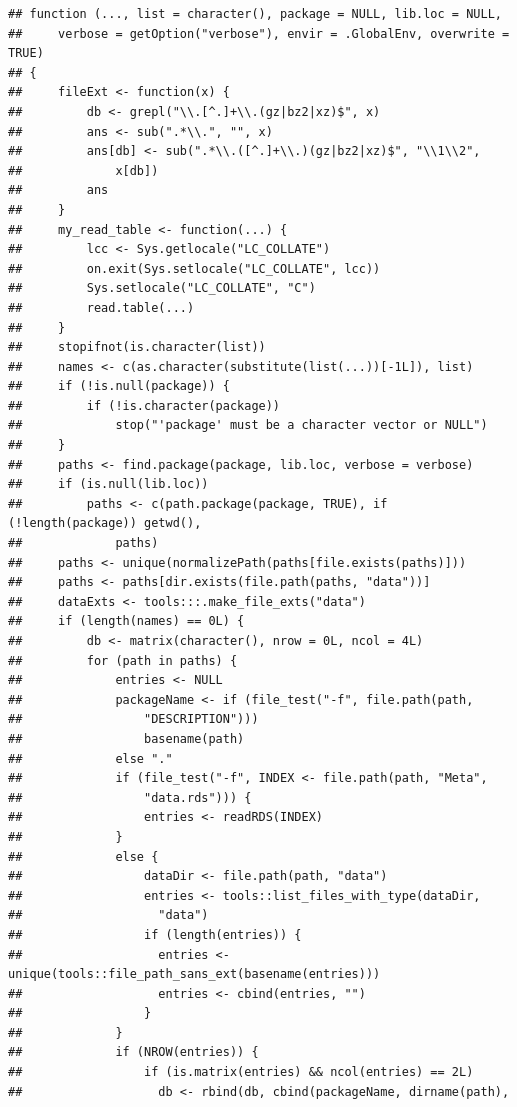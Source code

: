 \documentclass[
]{article}
\begin{document}
\begin{verbatim}
## function (..., list = character(), package = NULL, lib.loc = NULL, 
##     verbose = getOption("verbose"), envir = .GlobalEnv, overwrite = TRUE) 
## {
##     fileExt <- function(x) {
##         db <- grepl("\\.[^.]+\\.(gz|bz2|xz)$", x)
##         ans <- sub(".*\\.", "", x)
##         ans[db] <- sub(".*\\.([^.]+\\.)(gz|bz2|xz)$", "\\1\\2", 
##             x[db])
##         ans
##     }
##     my_read_table <- function(...) {
##         lcc <- Sys.getlocale("LC_COLLATE")
##         on.exit(Sys.setlocale("LC_COLLATE", lcc))
##         Sys.setlocale("LC_COLLATE", "C")
##         read.table(...)
##     }
##     stopifnot(is.character(list))
##     names <- c(as.character(substitute(list(...))[-1L]), list)
##     if (!is.null(package)) {
##         if (!is.character(package)) 
##             stop("'package' must be a character vector or NULL")
##     }
##     paths <- find.package(package, lib.loc, verbose = verbose)
##     if (is.null(lib.loc)) 
##         paths <- c(path.package(package, TRUE), if (!length(package)) getwd(), 
##             paths)
##     paths <- unique(normalizePath(paths[file.exists(paths)]))
##     paths <- paths[dir.exists(file.path(paths, "data"))]
##     dataExts <- tools:::.make_file_exts("data")
##     if (length(names) == 0L) {
##         db <- matrix(character(), nrow = 0L, ncol = 4L)
##         for (path in paths) {
##             entries <- NULL
##             packageName <- if (file_test("-f", file.path(path, 
##                 "DESCRIPTION"))) 
##                 basename(path)
##             else "."
##             if (file_test("-f", INDEX <- file.path(path, "Meta", 
##                 "data.rds"))) {
##                 entries <- readRDS(INDEX)
##             }
##             else {
##                 dataDir <- file.path(path, "data")
##                 entries <- tools::list_files_with_type(dataDir, 
##                   "data")
##                 if (length(entries)) {
##                   entries <- unique(tools::file_path_sans_ext(basename(entries)))
##                   entries <- cbind(entries, "")
##                 }
##             }
##             if (NROW(entries)) {
##                 if (is.matrix(entries) && ncol(entries) == 2L) 
##                   db <- rbind(db, cbind(packageName, dirname(path), 

\end{verbatim}
\end{document}
